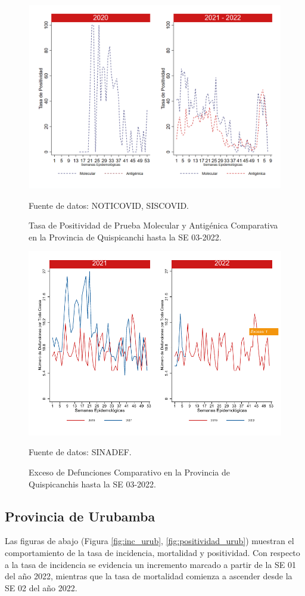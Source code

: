 \documentclass[12pt,a4paper,openany]{book}
\begin{document}
		\begin{figure}[h]
			\caption{Tasa de Positividad de Prueba Molecular y Antigénica Comparativa en la Provincia de Quispicanchi hasta la SE 03-2022.}\label{fig:positividad_quisp}
			\begin{center}
				\includegraphics[width=0.7\linewidth]{../figuras/positividad_20_21_12.png}
			\end{center}
			{\footnotesize {Fuente de datos: NOTICOVID, SISCOVID.}}
		\end{figure}
		
		\begin{figure}[h]
			\caption{Exceso de Defunciones Comparativo en la Provincia de Quispicanchis hasta la SE 03-2022.}\label{fig:exceso_quisp}
			\begin{center}
				\includegraphics[width=0.7\linewidth]{../figuras/exceso_12.pdf}
			\end{center}
			{\footnotesize {Fuente de datos: SINADEF.}}
		\end{figure}
		
		\clearpage
		
		\subsection*{Provincia de Urubamba}
		\noindent Las figuras de abajo (Figura \ref{fig:inc_urub}, \ref{fig:positividad_urub}) muestran el comportamiento de la tasa de incidencia, mortalidad y positividad. Con respecto a la tasa de incidencia se evidencia un incremento marcado a partir de la SE 01 del año 2022, mientras que la tasa de mortalidad comienza a ascender desde la SE 02 del año 2022. 
	
\end{document}
